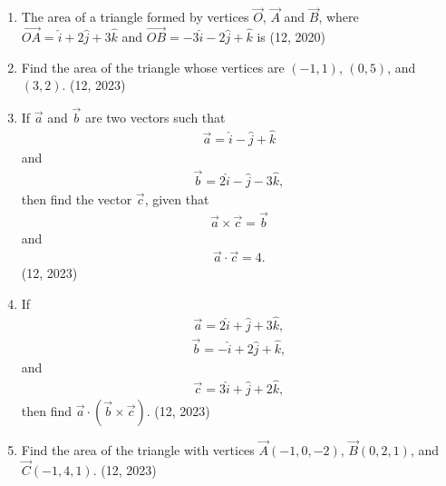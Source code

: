 \begin{enumerate}[label=\thesubsection.\arabic*, ref=\thesubsection.\theenumi]
\item The area of a triangle formed by vertices $\vec{O}$,  $\vec{A}$ and $\vec{B}$,  where $\overrightarrow{OA}= \hat{i}+2 \hat{j}+3\hat{k}$ and $\overrightarrow{OB}= -3\hat{i} - 2\hat{j} + \hat{k}$ is
\hfill (12,  2020)
    \item  Find the area of the triangle whose vertices are $(-1,  1)$,  $(0,  5)$,  and $(3,  2)$.
    \hfill (12,  2023)
    \item If $\overrightarrow{a}$ and $\overrightarrow{b}$ are two vectors such that
    \begin{align}
        \overrightarrow{a} = \hat{i} - \hat{j} + \hat{k}
    \end{align}
    and
    \begin{align}
        \overrightarrow{b} = 2\hat{i} - \hat{j} - 3\hat{k}, 
    \end{align}
    then find the vector $\overrightarrow{c}$,  given that
    \begin{align}
        \overrightarrow{a} \times \overrightarrow{c} = \overrightarrow{b}
    \end{align}
    and
    \begin{align}
        \overrightarrow{a} \cdot \overrightarrow{c} = 4.
    \end{align}
    \hfill (12,  2023)
    \item If
    \begin{align}
        \overrightarrow{a} = 2\hat{i} + \hat{j} + 3\hat{k}, 
    \end{align}
    \begin{align}
        \overrightarrow{b} = -\hat{i} + 2\hat{j} + \hat{k}, 
    \end{align}
    and
    \begin{align}
        \overrightarrow{c} = 3\hat{i} + \hat{j} + 2\hat{k}, 
    \end{align}
    then find $\overrightarrow{a} \cdot (\overrightarrow{b} \times \overrightarrow{c})$.
    \hfill (12,  2023)
    \item Find the area of the triangle with vertices $\vec{A}(-1,  0,  -2)$,  $\vec{B}(0,  2,  1)$,  and $\vec{C}(-1,  4,  1)$.
    \hfill (12,  2023)


\end{enumerate}
